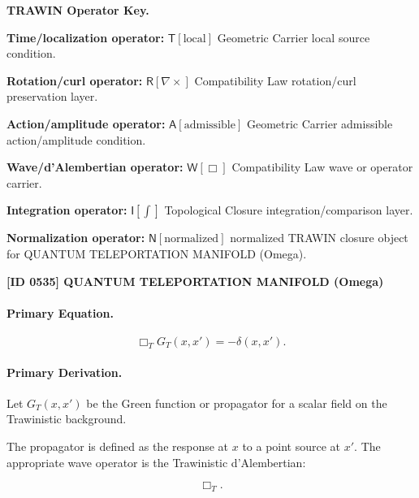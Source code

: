 \par\vspace{0.45\baselineskip}
\noindent\begin{minipage}[t]{\linewidth}
\begingroup
\small
\raggedright
\textbf{TRAWIN Operator Key.}\par
\noindent\textbf{Time/localization operator:} $\mathsf{T}\!\left[\mathrm{local}\right]$ Geometric Carrier local source condition.\par
\noindent\textbf{Rotation/curl operator:} $\mathsf{R}\!\left[\nabla\times\right]$ Compatibility Law rotation/curl preservation layer.\par
\noindent\textbf{Action/amplitude operator:} $\mathsf{A}\!\left[\mathrm{admissible}\right]$ Geometric Carrier admissible action/amplitude condition.\par
\noindent\textbf{Wave/d'Alembertian operator:} $\mathsf{W}\!\left[\Box\right]$ Compatibility Law wave or operator carrier.\par
\noindent\textbf{Integration operator:} $\mathsf{I}\!\left[\int\right]$ Topological Closure integration/comparison layer.\par
\noindent\textbf{Normalization operator:} $\mathsf{N}\!\left[\mathrm{normalized}\right]$ normalized TRAWIN closure object for QUANTUM TELEPORTATION MANIFOLD (Omega).\par
\endgroup
\end{minipage}

\clearpage
\noindent\textbf{[ID 0535] QUANTUM TELEPORTATION MANIFOLD (Omega)}\par
\vspace{0.35em}
\paragraph{Primary Equation.}
\begin{equation}
\Box_T G_T(x,x')
=
-\delta(x,x') .
\end{equation}

\paragraph{Primary Derivation.}
Let $G_T(x,x')$ be the Green function or propagator for a scalar field on the Trawinistic background.

The propagator is defined as the response at $x$ to a point source at $x'$.  
The appropriate wave operator is the Trawinistic d'Alembertian:

\begin{equation}
\Box_T .
\end{equation}

